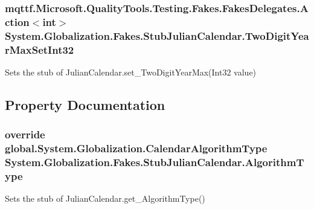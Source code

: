 \hypertarget{class_system_1_1_globalization_1_1_fakes_1_1_stub_julian_calendar_a90461a547e45081957d2858212ae7fd1}{
\subsubsection[{Two\-Digit\-Year\-Max\-Set\-Int32}]{\setlength{\rightskip}{0pt plus 5cm}mqttf.\-Microsoft.\-Quality\-Tools.\-Testing.\-Fakes.\-Fakes\-Delegates.\-Action$<$int$>$ System.\-Globalization.\-Fakes.\-Stub\-Julian\-Calendar.\-Two\-Digit\-Year\-Max\-Set\-Int32}}\label{class_system_1_1_globalization_1_1_fakes_1_1_stub_julian_calendar_a90461a547e45081957d2858212ae7fd1}


Sets the stub of Julian\-Calendar.\-set\-\_\-\-Two\-Digit\-Year\-Max(\-Int32 value)



\subsection{Property Documentation}
\hypertarget{class_system_1_1_globalization_1_1_fakes_1_1_stub_julian_calendar_a16e2a4d3f5eedc15a34b6cd6d1697f33}{
\subsubsection[{Algorithm\-Type}]{\setlength{\rightskip}{0pt plus 5cm}override global.\-System.\-Globalization.\-Calendar\-Algorithm\-Type System.\-Globalization.\-Fakes.\-Stub\-Julian\-Calendar.\-Algorithm\-Type\hspace{0.3cm}{\ttfamily [get]}}}\label{class_system_1_1_globalization_1_1_fakes_1_1_stub_julian_calendar_a16e2a4d3f5eedc15a34b6cd6d1697f33}


Sets the stub of Julian\-Calendar.\-get\-\_\-\-Algorithm\-Type()

